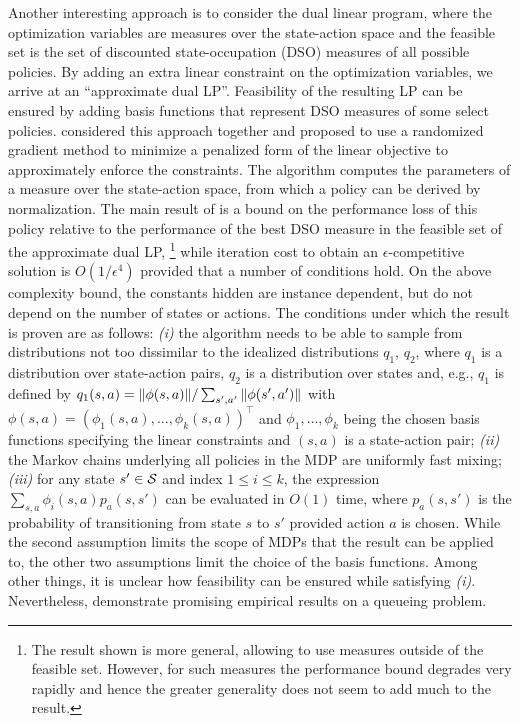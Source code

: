 \documentclass[12pt,draftcls,onecolumn]{IEEEtran}
\begin{document}
Another interesting approach is to consider the dual linear program, 
where the optimization variables are measures
over the state-action space and the feasible set is the set of  
discounted state-occupation (DSO) measures of all possible policies.
By adding an extra linear constraint on the optimization variables, 
we arrive at an ``approximate dual LP''. 
Feasibility of the resulting LP can be ensured by adding 
basis functions that represent DSO measures of some select policies.
\citet{abbbama14:dualLP} considered this approach together 
and proposed to use a randomized gradient method
to minimize a penalized form of the linear objective to approximately enforce the constraints. 
The algorithm computes the parameters of a measure over the state-action space, 
from which a policy can be derived
by normalization.
The main result of \citeauthor{abbbama14:dualLP} is a bound on the performance loss of this policy relative to the
performance of the best DSO measure in the feasible set of the approximate dual LP,%
\footnote{The result shown is more general, allowing to use measures outside of the feasible set. However,
for such measures the performance bound degrades very rapidly and hence the greater generality
does not seem to add much to the result.}
while iteration cost to obtain an $\epsilon$-competitive solution
is $O(1/\epsilon^4)$ provided that a number of conditions hold.
On the above complexity bound, the constants hidden are instance dependent, but do not depend on
the number of states or actions.
The conditions under which the result is proven are as follows:
{\em (i)} the algorithm needs to be able to sample from distributions not too dissimilar
to the idealized distributions $q_1$, $q_2$, where
$q_1$ is a distribution over state-action pairs, $q_2$ is a distribution over states
and, e.g., $q_1$ is defined by $q_1(s,a) = \norm{\phi(s,a)}/ \sum_{s',a'} \norm{\phi(s',a')}$ with $\phi(s,a) = (\phi_1(s,a),\dots,\phi_k(s,a))^\top$ and $\phi_1,\dots,\phi_k$ being the chosen basis functions specifying the linear constraints
and $(s,a)$ is a state-action pair;
{\em (ii)} the Markov chains underlying all policies in the MDP are uniformly fast mixing;
{\em (iii)} for any state $s'\in \S$ and index $1\le i \le k$, 
the expression $\sum_{s,a} \phi_i(s,a) p_a(s,s')$ can be evaluated in $O(1)$ time,
where $p_a(s,s')$ is the probability of transitioning from state $s$ to $s'$ provided action $a$ is chosen.
While the second assumption limits the scope of MDPs that the result can be applied to,
the other two assumptions limit the choice of the basis functions. 
Among other things, it is unclear how feasibility can be ensured while satisfying {\em (i)}.
Nevertheless, \citeauthor{abbbama14:dualLP} demonstrate promising empirical results on a queueing problem.
\end{document}
